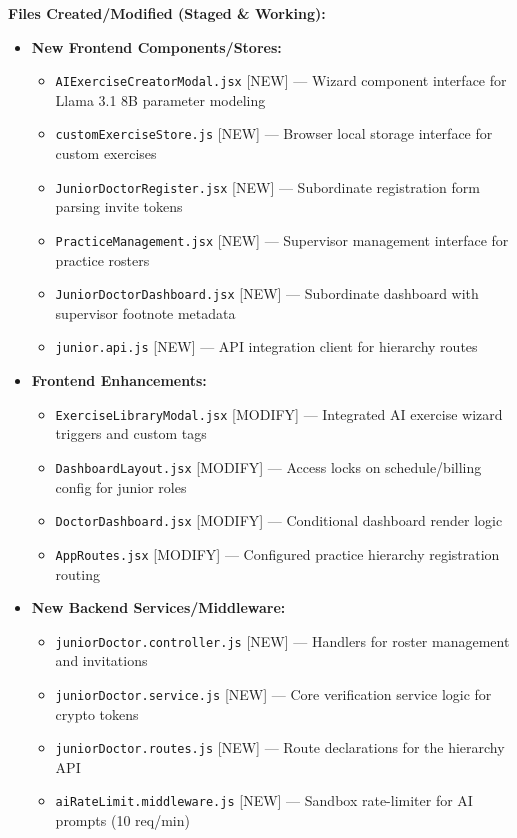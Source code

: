 \documentclass[11pt,a4paper]{article}
\begin{document}
\begin{itemize}
{\textbf{Files Created/Modified (Staged \& Working):}
\begin{itemize}
  \item \textbf{New Frontend Components/Stores:}
    \begin{itemize}
      \item \texttt{AIExerciseCreatorModal.jsx} [NEW] --- Wizard component interface for Llama 3.1 8B parameter modeling
      \item \texttt{customExerciseStore.js} [NEW] --- Browser local storage interface for custom exercises
      \item \texttt{JuniorDoctorRegister.jsx} [NEW] --- Subordinate registration form parsing invite tokens
      \item \texttt{PracticeManagement.jsx} [NEW] --- Supervisor management interface for practice rosters
      \item \texttt{JuniorDoctorDashboard.jsx} [NEW] --- Subordinate dashboard with supervisor footnote metadata
      \item \texttt{junior.api.js} [NEW] --- API integration client for hierarchy routes
    \end{itemize}
  \item \textbf{Frontend Enhancements:}
    \begin{itemize}
      \item \texttt{ExerciseLibraryModal.jsx} [MODIFY] --- Integrated AI exercise wizard triggers and custom tags
      \item \texttt{DashboardLayout.jsx} [MODIFY] --- Access locks on schedule/billing config for junior roles
      \item \texttt{DoctorDashboard.jsx} [MODIFY] --- Conditional dashboard render logic
      \item \texttt{AppRoutes.jsx} [MODIFY] --- Configured practice hierarchy registration routing
    \end{itemize}
  \item \textbf{New Backend Services/Middleware:}
    \begin{itemize}
      \item \texttt{juniorDoctor.controller.js} [NEW] --- Handlers for roster management and invitations
      \item \texttt{juniorDoctor.service.js} [NEW] --- Core verification service logic for crypto tokens
      \item \texttt{juniorDoctor.routes.js} [NEW] --- Route declarations for the hierarchy API
      \item \texttt{aiRateLimit.middleware.js} [NEW] --- Sandbox rate-limiter for AI prompts (10 req/min)

\end{itemize}
\end{itemize}}
\end{itemize}
\end{document}
